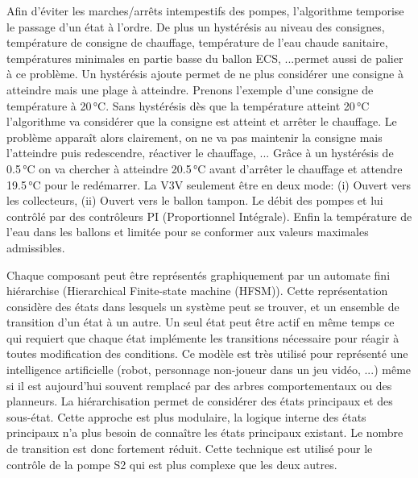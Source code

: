 Afin d’éviter les marches/arrêts intempestifs des pompes, l’algorithme temporise
le passage d’un état à l’ordre. De plus un hystérésis au niveau des consignes, température
de consigne de chauffage, température de l’eau chaude sanitaire, températures minimales
en partie basse du ballon ECS, ...permet aussi de palier à ce problème. Un hystérésis
ajoute permet de ne plus considérer une consigne à atteindre mais une plage à atteindre.
Prenons l’exemple d’une consigne de température à 20\,\si{\degreeCelsius}.
Sans hystérésis dès que la température atteint 20\,\si{\degreeCelsius} l’algorithme
va considérer que la consigne est atteint et arrêter le chauffage.
Le problème apparaît alors clairement, on ne va pas maintenir la
consigne mais l’atteindre puis redescendre, réactiver le chauffage, ...
Grâce à un hystérésis de 0.5\,\si{\degreeCelsius} on va chercher à atteindre 20.5\,\si{\degreeCelsius}
avant d’arrêter le chauffage et attendre 19.5\,\si{\degreeCelsius} pour le redémarrer.
La V3V seulement être en deux mode: (i) Ouvert vers les collecteurs, (ii) Ouvert vers
le ballon tampon. Le débit des pompes et lui contrôlé par des contrôleurs PI (Proportionnel Intégrale).
Enfin la température de l’eau dans les ballons et limitée pour se conformer aux
valeurs maximales admissibles.

Chaque composant peut être représentés graphiquement par un automate fini hiérarchise
(Hierarchical Finite-state machine (HFSM)).
Cette représentation considère des états dans lesquels un système peut se trouver, et un
ensemble de transition d’un état à un autre. Un seul état peut être actif en même temps ce qui
requiert que chaque état implémente les transitions nécessaire pour réagir à toutes modification des conditions.
Ce modèle est très utilisé pour représenté une intelligence artificielle (robot,
personnage non-joueur dans un jeu vidéo, ...) même si il est aujourd’hui souvent
remplacé par des arbres comportementaux ou des planneurs.
La hiérarchisation permet de considérer des états principaux et des sous-état. Cette
approche est plus modulaire, la logique interne des états principaux n’a plus besoin
de connaître les états principaux existant. Le nombre de transition est donc fortement
réduit. Cette technique est utilisé pour le contrôle de la pompe S2 qui est plus complexe que les deux
autres.



